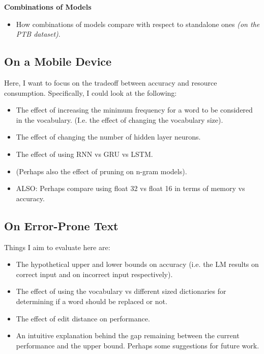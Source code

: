 \documentclass[a4paper, 12pt]{report}
\newcommand{\tbf}[1]{\textbf{#1}}
\newcommand{\tit}[1]{\textit{#1}}
\begin{document}
\tbf{Combinations of Models}
\begin{itemize}
\item
	How combinations of models compare with respect to standalone ones \tit{(on the PTB dataset)}.
\end{itemize}


\subsection{On a Mobile Device}
Here, I want to focus on the tradeoff between accuracy and resource consumption. Specifically, I could look at the following: \\
\begin{itemize}
\item
	The effect of increasing the minimum frequency for a word to be considered in the vocabulary. (I.e. the effect of changing the vocabulary size).
\item
	The effect of changing the number of hidden layer neurons.
\item
	The effect of using RNN vs GRU vs LSTM.
\item
	(Perhaps also the effect of pruning on n-gram models).
\item
	ALSO: Perhaps compare using float 32 vs float 16 in terms of memory vs accuracy.
\end{itemize}

\subsection{On Error-Prone Text}
Things I aim to evaluate here are: \\
\begin{itemize}
\item
	The hypothetical upper and lower bounds on accuracy (i.e. the LM results on correct input and on incorrect input respectively).
\item
	The effect of using the vocabulary vs different sized dictionaries for determining if a word should be replaced or not.
\item
	The effect of edit distance on performance.
\item
	An intuitive explanation behind the gap remaining between the current performance and the upper bound. Perhaps some suggestions for future work.
\end{itemize}
\end{document}
